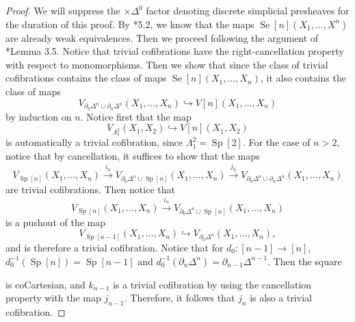 \documentclass[a4paper]{article}
\numberwithin{equation}{subsection}
\theoremstyle{plain}   %
\theoremstyle{definition}
\theoremstyle{remark}
\theoremstyle{plain}
\begin{document}
\begin{proof}
	We will suppress the \(\times \Delta^0\) factor denoting discrete simplicial presheaves for the duration of this proof.  By \cite{rezk-theta-n-spaces}*{5.2}, we know that the maps \(\operatorname{Se}[n](X_1,\dots,X^n)\) are already weak equivalences.  Then we proceed following the argument of \cite{jtsegal}*{Lemma 3.5}.  Notice that trivial cofibrations have the right-cancellation property with respect to monomorphisms.  Then we show that since the class of trivial cofibrations contains the class of maps \(\operatorname{Se}[n](X_1,\dots,X_n)\), it also contains the class of maps 
	\[V_{\partial_0 \Delta^n \cup \partial_n \Delta^n}(X_1,\dots,X_n)\hookrightarrow V[n](X_1,\dots,X_n)\] by induction on \(n\).  Notice first that the map
	\[V_{\Lambda^2_1}(X_1,X_2)\hookrightarrow V[n](X_1,X_2)\]
	is automatically a trivial cofibration, since \(\Lambda^2_1=\operatorname{Sp}[2]\).
	For the case of \(n>2\), notice that by cancellation, it suffices to show that the maps
	\[V_{\operatorname{Sp}[n]}(X_1,\dots, X_n) \xrightarrow{i_n} V_{\partial_0\Delta^n \cup \operatorname{Sp}[n]}(X_1,\dots, X_n) \xrightarrow{j_n} V_{\partial_0 \Delta^n \cup \partial_n \Delta^n}(X_1,\dots,X_n)\]
	are trivial cofibrations.
	Then notice that 
	\[V_{\operatorname{Sp}[n]}(X_1,\dots,X_n) \xrightarrow{i_n} V_{\partial_0 \Delta^n\cup \operatorname{Sp}[n]}(X_1,\dots,X_n)\]
	is a pushout of the map 
	\[V_{\operatorname{Sp}[n-1]}(X_1,\dots,X_n) \hookrightarrow V_{\partial_0 \Delta^n}(X_1,\dots,X_n),\]
	and is therefore a trivial cofibration.  
	Notice that for \(d_0: [n-1] \to [n]\), \(d_0^{-1}(\operatorname{Sp}[n]) = \operatorname{Sp}[n-1]\) and \(d_0^{-1}(\partial_n\Delta^n) = \partial_{n-1}\Delta^{n-1}\).  Then the square
	\begin{center}
	\end{center}
	is coCartesian, and \(k_{n-1}\) is a trivial cofibration by using the cancellation property with the map \(j_{n-1}\).
	Therefore, it follows that \(j_n\) is also a trivial cofibration. 


\end{proof}
\end{document}
